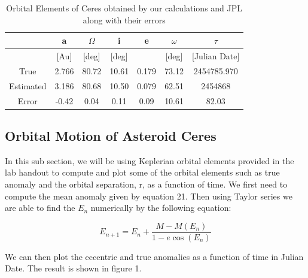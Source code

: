 \documentclass[letterpaper,12pt]{article}
\begin{document}
\FloatBarrier
\begin{table}[h!]
\caption{Orbital Elements of Ceres obtained by our calculations and JPL along with their errors} %
\centering %
\begin{tabular}{| c | c | c | c | c | c | c |} %
\hline\hline %
 & a & \begin{math} \Omega \end{math}  & i & e & \begin{math} \omega \end{math}  & \begin{math} \tau \end{math} \\ [0.5ex] %
\hline %
  & [Au]  &  [deg] &[deg] & & [deg] & [Julian Date] \\ \hline 
True & 2.766 &  80.72 &   10.61 & 0.179 & 73.12 &2454785.970\\ \hline
Estimated &3.186 &  80.68 & 10.50 &  0.079 & 62.51 & 2454868\\  \hline
Error & -0.42 &  0.04 &    0.11 &   0.09 & 10.61 & 82.03\\[1ex] %
\hline %
\end{tabular}
\label{table:nonlin} %
\end{table}
\FloatBarrier

\subsection{Orbital Motion of Asteroid Ceres}
In this sub section, we will be using Keplerian orbital elements provided in the lab handout to compute and plot some of the orbital elements such as true anomaly and the orbital separation, r, as a function of time. 
We first need to compute the mean anomaly given by equation 21. Then using Taylor series we are able to find the \begin{math} E_{n} \end{math} numerically by the following equation:

\begin{equation}
E_{n+1}=E_{n}+\frac{M-M(E_{n})}{1-e\cos(E_{n})}
\end{equation}


We can then plot the eccentric and true anomalies as a function of time in Julian Date. The result is shown in figure 1.
\end{document}
